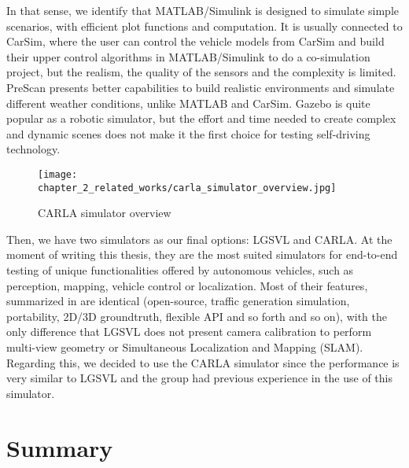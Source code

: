 In that sense, we identify that MATLAB/Simulink is designed to simulate simple scenarios, with efficient plot functions and computation. It is usually connected to CarSim, where the user can control the vehicle models from CarSim and build their upper control algorithms in MATLAB/Simulink to do a co-simulation project, but the realism, the quality of the sensors and the complexity is limited. PreScan presents better capabilities to build realistic environments and simulate different weather conditions, unlike MATLAB and CarSim. Gazebo is quite popular as a robotic simulator, but the effort and time needed to create complex and dynamic scenes does not make it the first choice for testing self-driving technology. 

\begin{figure}[h]
	\centering
	\texttt{[image: chapter\_2\_related\_works/carla\_simulator\_overview.jpg]}
	\caption{CARLA simulator overview}
	\label{fig:chapter_2_related_works/carla_simulator_overview}
\end{figure}

Then, we have two simulators as our final options: LGSVL and CARLA. At the moment of writing this thesis, they are the most suited simulators for end-to-end testing of unique functionalities offered by autonomous vehicles, such as perception, mapping, vehicle control or localization. Most of their features, summarized in \cite{kaur2021survey} are identical (open-source, traffic generation simulation, portability, 2D/3D groundtruth, flexible API and so forth and so on), with the only difference that LGSVL does not present camera calibration to perform multi-view geometry or Simultaneous Localization and Mapping (SLAM). Regarding this, we decided to use the CARLA simulator since the performance is very similar to LGSVL and the group had previous experience in the use of this simulator. %

\section{Summary}
\label{sec:2_summary}


